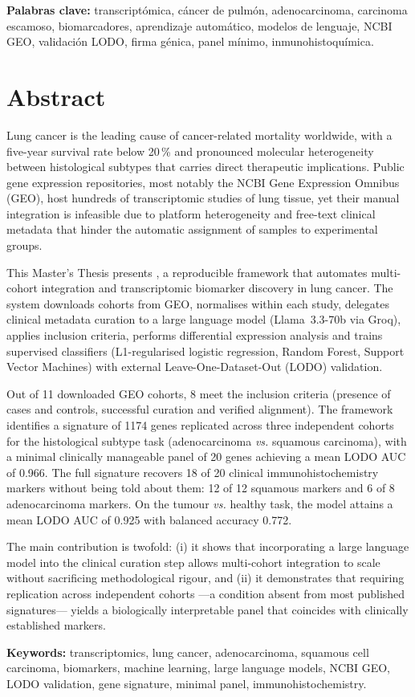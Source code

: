 \vspace{1cm}
\noindent\textbf{Palabras clave:} transcriptómica, cáncer de pulmón,
adenocarcinoma, carcinoma escamoso, biomarcadores, aprendizaje automático,
modelos de lenguaje, NCBI GEO, validación LODO, firma génica, panel mínimo,
inmunohistoquímica.

\clearpage

\chapter*{Abstract}
{}

Lung cancer is the leading cause of cancer-related mortality worldwide, with
a five-year survival rate below 20\,\% and pronounced molecular heterogeneity
between histological subtypes that carries direct therapeutic implications.
Public gene expression repositories, most notably the NCBI Gene Expression
Omnibus (GEO), host hundreds of transcriptomic studies of lung tissue, yet
their manual integration is infeasible due to platform heterogeneity and
free-text clinical metadata that hinder the automatic assignment of samples
to experimental groups.

This Master's Thesis presents \framework, a reproducible framework that
automates multi-cohort integration and transcriptomic biomarker discovery in
lung cancer. The system downloads cohorts from GEO, normalises within each
study, delegates clinical metadata curation to a large language model
(Llama~3.3-70b via Groq), applies inclusion criteria, performs differential
expression analysis and trains supervised classifiers (L1-regularised
logistic regression, Random Forest, Support Vector Machines) with external
Leave-One-Dataset-Out (LODO) validation.

Out of 11 downloaded GEO cohorts, 8 meet the inclusion criteria (presence of
cases and controls, successful curation and verified alignment). The
framework identifies a signature of 1174 genes replicated across three
independent cohorts for the histological subtype task (adenocarcinoma
\emph{vs.} squamous carcinoma), with a minimal clinically manageable panel of
20 genes achieving a mean LODO AUC of 0.966. The full signature recovers
18 of 20 clinical immunohistochemistry markers without being told about them:
12 of 12 squamous markers and 6 of 8 adenocarcinoma markers. On the tumour
\emph{vs.} healthy task, the model attains a mean LODO AUC of 0.925 with
balanced accuracy 0.772.

The main contribution is twofold: (i) it shows that incorporating a large
language model into the clinical curation step allows multi-cohort
integration to scale without sacrificing methodological rigour, and (ii) it
demonstrates that requiring replication across independent cohorts —a
condition absent from most published signatures— yields a biologically
interpretable panel that coincides with clinically established markers.

\vspace{1cm}
\noindent\textbf{Keywords:} transcriptomics, lung cancer, adenocarcinoma,
squamous cell carcinoma, biomarkers, machine learning, large language
models, NCBI GEO, LODO validation, gene signature, minimal panel,
immunohistochemistry.

\clearpage
